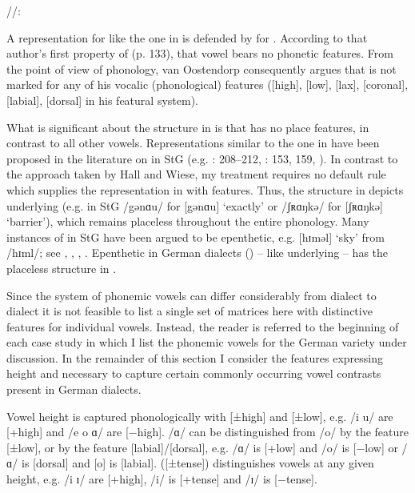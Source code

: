 \ea%
    \label{ex:2:7}
        //: 
\z

A representation for  like the one in  is defended by \citet[133--134]{vanOostendorp2000} for . According to that author’s first property of  (p. 133), that vowel bears no phonetic features. From the point of view of phonology, van Oostendorp consequently argues that   is not marked for any of his vocalic (phonological) features ([high], [low], [lax], [coronal], [labial], [dorsal] in his featural system).

What is significant about the structure in  is that  has no place features, in contrast to all other vowels. Representations similar to the one in  have been proposed in the literature on  in StG (e.g. \citealt{Hall1992}: 208--212, \citealt{Wiese1996a}: 153, 159, \citealt{Trommer2021}). In contrast to the approach taken by Hall and Wiese, my treatment requires no default rule which supplies the representation in  with features. Thus, the structure in  depicts underlying  (e.g. in StG /gənɑu/ for [gənɑu] ‘exactly’ or /ʃʀɑŋkə/ for [ʃʀɑŋkə] ‘barrier’), which remains placeless throughout the entire phonology. Many instances of  in StG have been argued to be epenthetic, e.g. [hɪməl] ‘sky’ from /hɪml/; see \citet{Wiese1988}, \citet{Hall1992}, \citet{Noske1993}, \citet{Wiese1996a}. Epenthetic  in German dialects () -- like underlying  -- has the placeless structure in .

Since the system of phonemic vowels can differ considerably from dialect to dialect it is not feasible to list a single set of matrices here with distinctive features for individual vowels. Instead, the reader is referred to the beginning of each case study in which I list the phonemic vowels for the German variety under discussion. In the remainder of this section I consider the features expressing height and  necessary to capture certain commonly occurring vowel contrasts present in German dialects.

Vowel height is captured phonologically with [±high] and [±low], e.g. /i u/ are [+high] and /e o ɑ/ are [−high]. /ɑ/ can be distinguished from /o/ by the feature [±low], or by the feature [labial]/[dorsal], e.g. /ɑ/ is [+low] and /o/ is [−low] or /ɑ/ is [dorsal] and [o] is [labial].  ([±tense]) distinguishes vowels at any given height, e.g. /i ɪ/ are [+high], /i/ is [+tense] and /ɪ/ is     [−tense].

